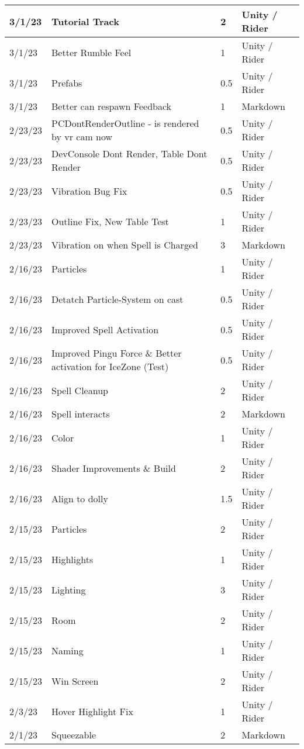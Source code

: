 \begin{longtable}{|p{1.5cm}|p{6cm}|p{1.2cm}|p{2.7cm}|}
	3/1/23 & Tutorial Track & 2 & Unity / Rider \\ \hline
	3/1/23 & Better Rumble Feel & 1 & Unity / Rider \\ \hline
	3/1/23 & Prefabs & 0.5 & Unity / Rider \\ \hline
	3/1/23 & Better can respawn Feedback & 1 & Markdown \\ \hline
	2/23/23 & PCDontRenderOutline - is rendered by vr cam now & 0.5 & Unity / Rider \\ \hline
	2/23/23 & DevConsole Dont Render, Table Dont Render & 0.5 & Unity / Rider \\ \hline
	2/23/23 & Vibration Bug Fix & 0.5 & Unity / Rider \\ \hline
	2/23/23 & Outline Fix, New Table Test & 1 & Unity / Rider \\ \hline
	2/23/23 & Vibration on when Spell is Charged & 3 & Markdown \\ \hline
	2/16/23 & Particles & 1 & Unity / Rider \\ \hline
	2/16/23 & Detatch Particle-System on cast & 0.5 & Unity / Rider \\ \hline
	2/16/23 & Improved Spell Activation & 0.5 & Unity / Rider \\ \hline
	2/16/23 & Improved Pingu Force \& Better activation for IceZone (Test) & 0.5 & Unity / Rider \\ \hline
	2/16/23 & Spell Cleanup & 2 & Unity / Rider \\ \hline
	2/16/23 & Spell interacts & 2 & Markdown \\ \hline
	2/16/23 & Color & 1 & Unity / Rider \\ \hline
	2/16/23 & Shader Improvements \& Build & 2 & Unity / Rider \\ \hline
	2/16/23 & Align to dolly & 1.5 & Unity / Rider \\ \hline
	2/15/23 & Particles & 2 & Unity / Rider \\ \hline
	2/15/23 & Highlights & 1 & Unity / Rider \\ \hline
	2/15/23 & Lighting & 3 & Unity / Rider \\ \hline
	2/15/23 & Room & 2 & Unity / Rider \\ \hline
	2/15/23 & Naming & 1 & Unity / Rider \\ \hline
	2/15/23 & Win Screen & 2 & Unity / Rider \\ \hline
	2/3/23 & Hover Highlight Fix & 1 & Unity / Rider \\ \hline
	2/1/23 & Squeezable & 2 & Markdown \\ \hline

\end{longtable}
